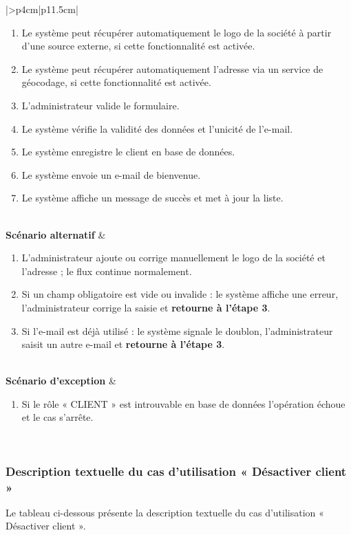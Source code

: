 \begin{longtable}{|>{}p{4cm}|p{11.5cm}|}
\begin{minipage}[t]{\linewidth}
\begin{enumerate}[label=\arabic*., nosep,leftmargin=0.6cm,topsep=0pt,itemsep=1pt,resume=scen_auth]
\item Le système peut récupérer automatiquement le logo de la société à partir d'une source externe, si cette fonctionnalité est activée.
\item Le système peut récupérer automatiquement l'adresse via un service de géocodage, si cette fonctionnalité est activée.
\item L'administrateur valide le formulaire.
\item Le système vérifie la validité des données et l'unicité de l'e-mail.
\item Le système enregistre le client en base de données.
\item Le système envoie un e-mail de bienvenue.
\item Le système affiche un message de succès et met à jour la liste.
\end{enumerate}
\vspace{0.1cm}
\end{minipage} \\
\hline
\textbf{Scénario alternatif} &
\begin{enumerate}[label=A\arabic*.,nosep,leftmargin=0.6cm,topsep=0pt,itemsep=1pt]
\item L'administrateur ajoute ou corrige manuellement le logo de la société et l'adresse ; le flux continue normalement.
\item Si un champ obligatoire est vide ou invalide : le système affiche une erreur, l'administrateur corrige la saisie et \textbf{retourne à l'étape 3}.
\item Si l'e-mail est déjà utilisé : le système signale le doublon, l'administrateur saisit un autre e-mail et \textbf{retourne à l'étape 3}.
\end{enumerate} \\
\hline
\textbf{Scénario d'exception} &
\begin{enumerate}[label=E\arabic*.,nosep,leftmargin=0.6cm,topsep=0pt,itemsep=1pt]
\item Si le rôle « CLIENT » est introuvable en base de données l'opération échoue et le cas s'arrête.
\end{enumerate} \\
\hline
\end{longtable}
\normalsize
\subsubsection{Description textuelle du cas d’utilisation « Désactiver client »}
Le tableau ci-dessous présente la description textuelle du cas d’utilisation « Désactiver client ».


